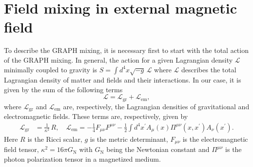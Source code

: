 \documentclass[a4paper,11pt]{article}
\begin{document}
 \section{Field mixing in external magnetic field}
 \label{sec:2}
 
To describe the GRAPH mixing, it is necessary first to start with the total action of the GRAPH mixing. In general, the action for a given Lagrangian density $\mathcal L$ minimally coupled to gravity is $S=\int d^4x \sqrt{-g}\,\mathcal L$ where $\mathcal L$  describes the total Lagrangian density of matter and fields and their interactions. In our case, it is given by the sum of the following terms
 \begin{equation}
\mathcal L=\mathcal L_\text{gr}+\mathcal L_\text{em},
\end{equation}
where $\mathcal L_\text{gr}$ and $\mathcal L_\text{em}$ are, respectively, the Lagrangian densities of  gravitational and electromagnetic fields. These terms are, respectively, given by
\begin{align}\label{lag-dens}
\mathcal L_\text{gr} &=\frac{1}{\kappa^2}\,R,\quad \mathcal L_\text{em}=-\frac{1}{4}F_{\mu\nu}F^{\mu\nu}-\frac{1}{2}\int d^4x^\prime A_\mu(x) \Pi^{\mu\nu}(x, x^\prime)A_\nu(x^\prime).
\end{align}
Here $R$ is the Ricci scalar, $g$ is the metric determinant, $F_{\mu\nu}$ is the electromagnetic field tensor, $\kappa^2=16\pi G_\text{N}$ with $G_\text{N}$ being the Newtonian constant and $\Pi^{\mu\nu}$ is the photon  polarization tensor in a magnetized medium. 
 
 
 
 
 
\end{document}
